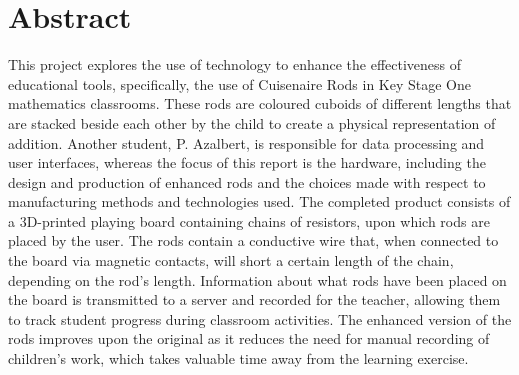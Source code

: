 \section*{Abstract}

This project explores the use of technology to enhance the effectiveness of educational tools, specifically, the use of Cuisenaire\textsuperscript{\textregistered} Rods in Key Stage One mathematics classrooms. These rods are coloured cuboids of different lengths that are stacked beside each other by the child to create a physical representation of  addition. Another student,  P. Azalbert, is responsible for data processing and user interfaces, whereas the focus of this report is the hardware, including the design and production of enhanced rods and the choices made with respect to manufacturing methods and technologies used. The completed product consists of a 3D-printed playing board containing chains of resistors, upon which rods are placed by the user. The rods contain a conductive wire that, when connected to the board via magnetic contacts, will short a certain length of the chain, depending on the rod's length. Information about what rods have been placed on the board is transmitted to a server and recorded for the teacher, allowing them to track student progress during classroom activities. The enhanced version of the rods improves upon the original as it reduces the need for manual recording of children’s work, which takes valuable time away from the learning exercise.